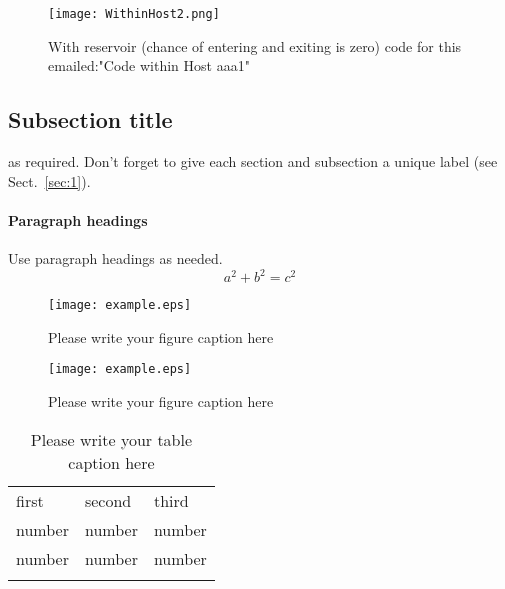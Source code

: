 \documentclass[twocolumn]{svjour3}          %
\begin{document}
\begin{figure*}
  \texttt{[image: WithinHost2.png]}
\caption{With reservoir (chance of entering and exiting is zero) code for this emailed:"Code within Host aaa1" }
\label{Within2}       %
\end{figure*}


\subsection{Subsection title}
\label{sec:2}
as required. Don't forget to give each section
and subsection a unique label (see Sect.~\ref{sec:1}).
\paragraph{Paragraph headings} Use paragraph headings as needed.
\begin{equation}
a^2+b^2=c^2
\end{equation}

\begin{figure}
  \texttt{[image: example.eps]}
\caption{Please write your figure caption here}
\label{fig:1}       %
\end{figure}
%
\begin{figure*}
  \texttt{[image: example.eps]}
\caption{Please write your figure caption here}
\label{fig:2}       %
\end{figure*}
%
\begin{table}
\caption{Please write your table caption here}
\label{tab:1}       %
\begin{tabular}{lll}
\hline\noalign{\smallskip}
first & second & third  \\
\noalign{\smallskip}\hline\noalign{\smallskip}
number & number & number \\
number & number & number \\
\noalign{\smallskip}\hline
\end{tabular}
\end{table}




\end{document}
